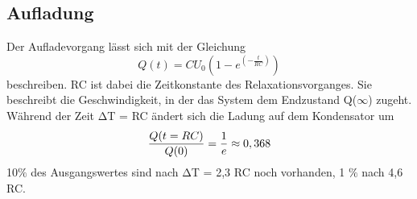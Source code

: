 \subsection{Aufladung}
Der Aufladevorgang lässt sich mit der Gleichung
\begin{equation}
	Q(t) = CU_0(1-e^{(-\frac{t}{RC})})
\end{equation}
beschreiben. RC ist dabei die Zeitkonstante des Relaxationsvorganges. Sie beschreibt die Geschwindigkeit, in der das System dem Endzustand Q($\infty$) zugeht. Während der Zeit $\increment$T = RC ändert sich die Ladung auf dem Kondensator um
\begin{equation}
	\frac{Q(t = RC)}{Q(0)} = \frac{1}{e} \approx 0,368 \notag
\end{equation}
10$\%$ des Ausgangswertes sind nach $\increment$T = 2,3 RC noch vorhanden, 1 $\%$ nach 4,6 RC.

